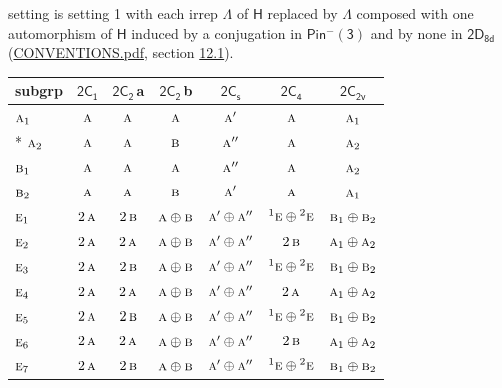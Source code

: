 \documentclass[10pt,a4paper]{article}
\numberwithin{equation}{section}
\newcommand{\grp}[1]{\mathsf{#1}}
\newcommand{\irr}[1]{\text{\normalfont\scshape #1}}
\newcommand{\conjpair}[1]{{}^{#1}}
\newcommand{\clsletter}[1]{\,{\scriptsize\color{black!55}#1}}
\begin{document}
setting is setting 1 with each irrep $\Lambda$ of $\grp{H}$ replaced by $\Lambda$ composed with one automorphism of $\grp{H}$ induced by a conjugation in \href{Pinminus3.pdf}{$\grp{Pin^{-}(3)}$} and by none in $\grp{2D_{8d}}$ (\href{../../CONVENTIONS.pdf}{CONVENTIONS.pdf}, section \href{../../../rotation/CONVENTIONS.pdf\#conv.12.1}{12.1}).
{\small\begin{longtable}{@{}lcccccc@{}}\toprule
subgrp & \href{2C1.pdf}{$\grp{2C_{1}}$} & \href{2C2.pdf}{$\grp{2C_{2}}$}\clsletter{a} & \href{2C2.pdf}{$\grp{2C_{2}}$}\clsletter{b} & \href{2C1v.pdf}{$\grp{2C_{s}}$} & \href{2C4.pdf}{$\grp{2C_{4}}$} & \href{2C2v.pdf}{$\grp{2C_{2v}}$}\\\midrule\endhead
\bottomrule\endfoot\endlastfoot
$\irr{a}_{1}$ & $\irr{a}$ & $\irr{a}$ & $\irr{a}$ & $\irr{a}'$ & $\irr{a}$ & $\irr{a}_{1}$\\*
$\irr{a}_{2}$ & $\irr{a}$ & $\irr{a}$ & $\irr{b}$ & $\irr{a}''$ & $\irr{a}$ & $\irr{a}_{2}$\\
$\irr{b}_{1}$ & $\irr{a}$ & $\irr{a}$ & $\irr{a}$ & $\irr{a}''$ & $\irr{a}$ & $\irr{a}_{2}$\\
$\irr{b}_{2}$ & $\irr{a}$ & $\irr{a}$ & $\irr{b}$ & $\irr{a}'$ & $\irr{a}$ & $\irr{a}_{1}$\\
$\irr{e}_{1}$ & $2\,\irr{a}$ & $2\,\irr{b}$ & $\irr{a}\oplus \irr{b}$ & $\irr{a}'\oplus \irr{a}''$ & $\conjpair{1}\irr{e}\oplus \conjpair{2}\irr{e}$ & $\irr{b}_{1}\oplus \irr{b}_{2}$\\
$\irr{e}_{2}$ & $2\,\irr{a}$ & $2\,\irr{a}$ & $\irr{a}\oplus \irr{b}$ & $\irr{a}'\oplus \irr{a}''$ & $2\,\irr{b}$ & $\irr{a}_{1}\oplus \irr{a}_{2}$\\
$\irr{e}_{3}$ & $2\,\irr{a}$ & $2\,\irr{b}$ & $\irr{a}\oplus \irr{b}$ & $\irr{a}'\oplus \irr{a}''$ & $\conjpair{1}\irr{e}\oplus \conjpair{2}\irr{e}$ & $\irr{b}_{1}\oplus \irr{b}_{2}$\\
$\irr{e}_{4}$ & $2\,\irr{a}$ & $2\,\irr{a}$ & $\irr{a}\oplus \irr{b}$ & $\irr{a}'\oplus \irr{a}''$ & $2\,\irr{a}$ & $\irr{a}_{1}\oplus \irr{a}_{2}$\\
$\irr{e}_{5}$ & $2\,\irr{a}$ & $2\,\irr{b}$ & $\irr{a}\oplus \irr{b}$ & $\irr{a}'\oplus \irr{a}''$ & $\conjpair{1}\irr{e}\oplus \conjpair{2}\irr{e}$ & $\irr{b}_{1}\oplus \irr{b}_{2}$\\
$\irr{e}_{6}$ & $2\,\irr{a}$ & $2\,\irr{a}$ & $\irr{a}\oplus \irr{b}$ & $\irr{a}'\oplus \irr{a}''$ & $2\,\irr{b}$ & $\irr{a}_{1}\oplus \irr{a}_{2}$\\
$\irr{e}_{7}$ & $2\,\irr{a}$ & $2\,\irr{b}$ & $\irr{a}\oplus \irr{b}$ & $\irr{a}'\oplus \irr{a}''$ & $\conjpair{1}\irr{e}\oplus \conjpair{2}\irr{e}$ & $\irr{b}_{1}\oplus \irr{b}_{2}$\\

\end{longtable}}
\end{document}
